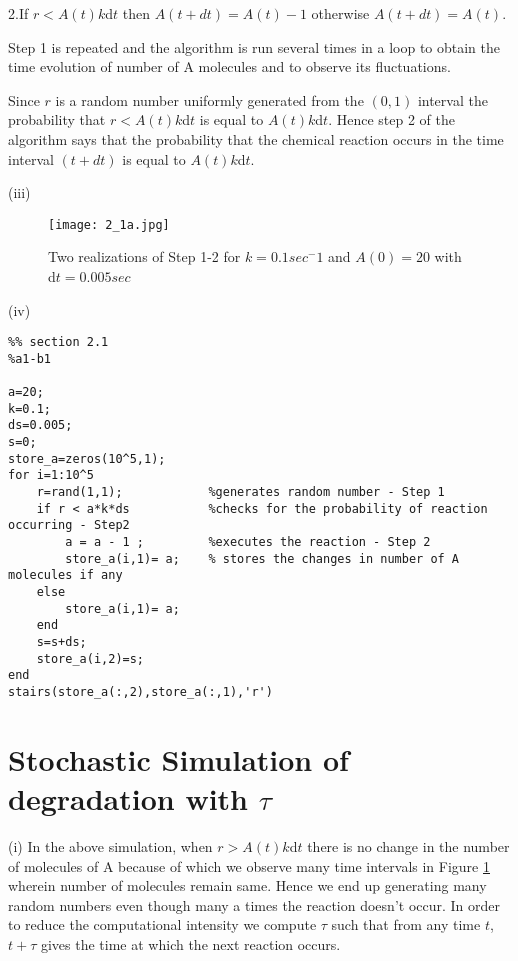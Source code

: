 \documentclass[10 pt]{article}
\begin{document}
\begin{multicols}{2}
\begin{flushleft}
2.If $r < A(t)k$d$t$ then $A(t+dt)=A(t)-1$ otherwise $A(t+dt)=A(t)$. 

Step 1 is repeated and the algorithm is run several times in a loop to obtain the time evolution of number of A molecules and to observe its fluctuations.

Since $r$ is a random number uniformly generated from the $(0,1)$ interval the probability that $r < A(t)k$d$t$ is equal to $A(t)k$d$t$. Hence step 2 of the algorithm says that the probability that the chemical reaction occurs in the time interval $(t+dt)$ is equal to $A(t)k$d$t$.  
\end{flushleft}
\begin{flushleft}
(iii)
\begin{figure}[H]
\centerline{\texttt{[image: 2\_1a.jpg]}}
\caption{Two realizations of Step 1-2 for $k=0.1 sec^-1$ and $A(0)=20$ with d$t = 0.005 sec$}
\label{1}
\end{figure}
(iv)
\begin{lstlisting}
%% section 2.1
%a1-b1

a=20;
k=0.1;
ds=0.005;
s=0;
store_a=zeros(10^5,1);
for i=1:10^5
    r=rand(1,1); 			%generates random number - Step 1
    if r < a*k*ds 			%checks for the probability of reaction occurring - Step2
        a = a - 1 ;			%executes the reaction - Step 2
        store_a(i,1)= a; 	% stores the changes in number of A molecules if any
    else
        store_a(i,1)= a; 
    end
    s=s+ds;
    store_a(i,2)=s;
end
stairs(store_a(:,2),store_a(:,1),'r')
\end{lstlisting}
\end{flushleft}
\section{Stochastic Simulation of degradation with $\tau$}
\begin{flushleft}
(i) 
In the above simulation, when $r > A(t)k$d$t$ there is no change in the number of molecules of A because of which we observe many time intervals in Figure \ref{1} wherein number of molecules remain same. Hence we end up generating many random numbers even though many a times the reaction doesn't occur. In order to reduce the computational intensity we compute $\tau$ such that from any time $t$, $t+\tau$ gives the time at which the next reaction occurs. \\


\end{flushleft}
\end{multicols}
\end{document}
